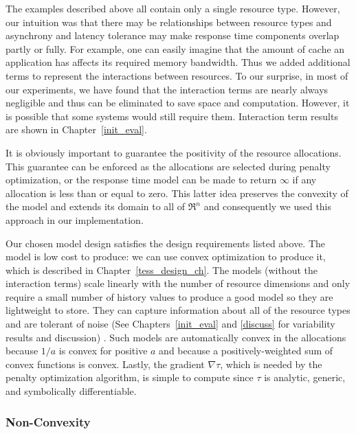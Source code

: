 The examples described above all contain only a single resource type.  However, our intuition was that there may be relationships between resource types and asynchrony and latency tolerance may make response time components overlap partly or fully. For example, one can easily imagine that the amount of cache an application has affects its required memory bandwidth.  Thus we added additional terms to represent the interactions between resources.  To our surprise, in most of our experiments, we have found that the interaction terms are nearly always negligible and thus can be eliminated to save space and computation.  However, it is possible that some systems would still require them.  Interaction term results are shown in Chapter~\ref{init_eval}.   

It is obviously important to guarantee the positivity of the resource allocations. This guarantee can be enforced as the allocations are selected during penalty optimization, or the response time model can be made to return $\infty$ if any allocation is less than or equal to zero. This latter idea preserves the convexity of the model and extends its domain to all of $\Re^n$ and consequently we used this approach in our implementation.

Our chosen model design satisfies the design requirements listed above.  The model is low cost to produce: we can use convex optimization to produce it, which is described in Chapter~\ref{tess_design_ch}. The models (without the interaction terms) scale linearly with the number of resource dimensions and only require a small number of history values to produce a good model so they are lightweight to store.  They can capture information about all of the resource types and are tolerant of noise (See Chapters~\ref{init_eval} and \ref{discuss} for variability results and discussion) . Such models are automatically convex in the allocations because $1/a$ is convex for positive $a$ and because a positively-weighted sum of convex functions is convex.  Lastly,
the gradient $\nabla\tau$, which is needed by the penalty optimization algorithm, is simple to compute since $\tau$ is analytic, generic, and symbolically differentiable.

\subsubsection{Non-Convexity}

